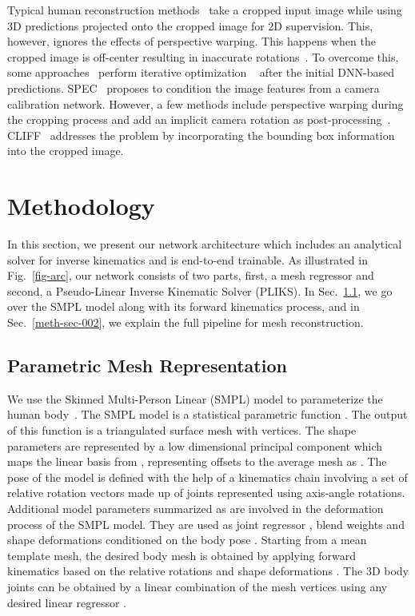 \documentclass[10pt,twocolumn,letterpaper]{article}
\begin{document}
Typical human reconstruction methods~\cite{hmr,spin} take a cropped input image while using 3D predictions projected onto the cropped image for 2D supervision.  This, however, ignores the effects of perspective warping. This happens when the cropped image is off-center resulting in inaccurate rotations~\cite{pcl}. To overcome this, some approaches~\cite{kama,wpc} perform iterative optimization ~\cite{bogo2016keep} after the initial DNN-based predictions. SPEC~\cite{spec} proposes to condition the image features from a camera calibration network. However, a few methods include perspective warping during the cropping process and add an implicit camera rotation as post-processing~\cite{mpiinf,pcl}. CLIFF~\cite{cliff} addresses the problem by incorporating the bounding box information into the cropped image.




\section{Methodology}
In this section, we present our network architecture which includes an analytical solver for inverse kinematics and is end-to-end trainable. As illustrated in Fig.~\ref{fig-arc}, our network consists of two parts, first, a mesh regressor and second, a Pseudo-Linear Inverse Kinematic Solver (PLIKS). In Sec.~\ref{meth-sec-001}, we go over the SMPL model along with its forward kinematics process, and in Sec.~\ref{meth-sec-002}, we explain the full pipeline for mesh reconstruction.


\subsection{Parametric Mesh Representation}\label{meth-sec-001}
We use the Skinned Multi-Person Linear (SMPL) model to parameterize the human body~\cite{smpl}. The SMPL model is a statistical parametric function . The output of this function is a triangulated surface mesh with  vertices. 
The shape parameters  are represented by a low dimensional principal component which maps the linear basis  from , representing offsets to the average mesh   as . The pose of the model is defined with the help of a kinematics chain involving a set of relative rotation vectors   made up of  joints represented using axis-angle rotations. Additional model parameters summarized as   are involved in the deformation process of the SMPL model. They are used as joint regressor , blend weights  and shape deformations conditioned on the body pose . Starting from a mean template mesh, the desired body mesh is obtained by applying forward kinematics based on the relative rotations  and shape deformations . The 3D body joints can be obtained by a linear combination of the mesh vertices using any desired linear regressor . 
\end{document}
